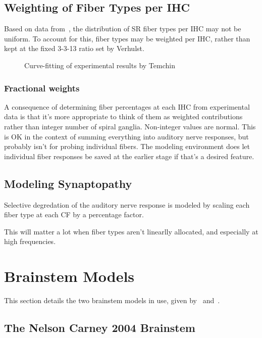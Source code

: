 \subsection{Weighting of Fiber Types per IHC} %
\label{sub:weighting_of_fiber_types_per_ihc}
Based on data from~\cite{Temchin2008Threshold}, the distribution of SR fiber types per IHC may not be uniform.  To account for this, fiber types may be weighted per IHC, rather than kept at the fixed 3-3-13 ratio set by Verhulst.  
\begin{figure}[htbp]
	\centering
	\caption{Curve-fitting of experimental results by Temchin}
	\label{fig:temchin-curvefit}
\end{figure}

\subsubsection{Fractional weights}
A consequence of determining fiber percentages at each IHC from experimental data is that it's more appropriate to think of them as weighted contributions rather than integer number of spiral ganglia.  Non-integer values are normal.  This is OK in the context of summing everything into auditory nerve responses, but probably isn't for probing individual fibers.  The modeling environment does let individual fiber responses be saved at the earlier stage if that's a desired feature.

\subsection{Modeling Synaptopathy} %
\label{sub:modeling_synaptopathy}
Selective degredation of the auditory nerve response is modeled by scaling each fiber type at each CF by a percentage factor.  

This will matter a lot when fiber types aren't linearlly allocated, and especially at high frequencies.

\section{Brainstem Models} %
\label{sec:brainstem_models}
This section details the two brainstem models in use, given by~\cite{Nelson2004Phenomenological} and~\cite{Carney2015Speech}.

\subsection{The Nelson Carney 2004 Brainstem} %
\label{sub:the_nelson_carney_2004_brainstem}

